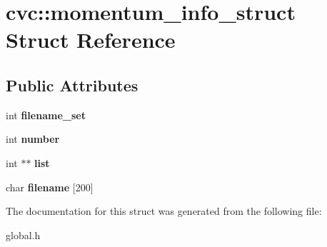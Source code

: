 \hypertarget{structcvc_1_1momentum__info__struct}{\section{cvc\-:\-:momentum\-\_\-info\-\_\-struct Struct Reference}
\label{structcvc_1_1momentum__info__struct}
}
\subsection*{Public Attributes}
\begin{DoxyCompactItemize}
\item 
\hypertarget{structcvc_1_1momentum__info__struct_a81c327ea0030047507986ef2068e307a}{int {\bfseries filename\-\_\-set}}\label{structcvc_1_1momentum__info__struct_a81c327ea0030047507986ef2068e307a}

\item 
\hypertarget{structcvc_1_1momentum__info__struct_a0062a2aba66f08af2c27ad4ab244ee3c}{int {\bfseries number}}\label{structcvc_1_1momentum__info__struct_a0062a2aba66f08af2c27ad4ab244ee3c}

\item 
\hypertarget{structcvc_1_1momentum__info__struct_a8843eef0dfaad4fbd598bc683d135810}{int $\ast$$\ast$ {\bfseries list}}\label{structcvc_1_1momentum__info__struct_a8843eef0dfaad4fbd598bc683d135810}

\item 
\hypertarget{structcvc_1_1momentum__info__struct_a1d81d13e2ae4ac11aab152329570cbc1}{char {\bfseries filename} \mbox{[}200\mbox{]}}\label{structcvc_1_1momentum__info__struct_a1d81d13e2ae4ac11aab152329570cbc1}

\end{DoxyCompactItemize}


The documentation for this struct was generated from the following file\-:\begin{DoxyCompactItemize}
\item 
global.\-h\end{DoxyCompactItemize}

